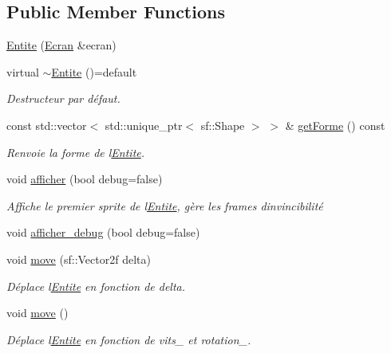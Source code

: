 \subsection*{Public Member Functions}
\begin{DoxyCompactItemize}
\item 
\mbox{\hyperlink{class_entite_a144da7dfc4ebff745b901e75c6167857}{Entite}} (\mbox{\hyperlink{class_ecran}{Ecran}} \&ecran)
\item 
virtual \mbox{\hyperlink{class_entite_a8084762a25afbfbcdca31121a3dfcd87}{$\sim$\+Entite}} ()=default
\begin{DoxyCompactList}\small\item\em Destructeur par défaut. \end{DoxyCompactList}\item 
const std\+::vector$<$ std\+::unique\+\_\+ptr$<$ sf\+::\+Shape $>$ $>$ \& \mbox{\hyperlink{class_entite_ad7314f276ea1808e98cfd8b7d0e900c8}{get\+Forme}} () const
\begin{DoxyCompactList}\small\item\em Renvoie la forme de l\textquotesingle{}\mbox{\hyperlink{class_entite}{Entite}}. \end{DoxyCompactList}\item 
void \mbox{\hyperlink{class_entite_ae8bcb6d81087b421b03f6a97b3aedb8c}{afficher}} (bool debug=false)
\begin{DoxyCompactList}\small\item\em Affiche le premier sprite de l\textquotesingle{}\mbox{\hyperlink{class_entite}{Entite}}, gère les frames d\textquotesingle{}invincibilité \end{DoxyCompactList}\item 
void \mbox{\hyperlink{class_entite_ac241fa1af0c598a820e2cae2ede17ac4}{afficher\+\_\+debug}} (bool debug=false)
\item 
void \mbox{\hyperlink{class_entite_a0e682335d5ae1518970a30eb07d8e6d1}{move}} (sf\+::\+Vector2f delta)
\begin{DoxyCompactList}\small\item\em Déplace l\textquotesingle{}\mbox{\hyperlink{class_entite}{Entite}} en fonction de {\itshape delta}. \end{DoxyCompactList}\item 
void \mbox{\hyperlink{class_entite_a2403ba6bc4c194e7421b6edd3228b69a}{move}} ()
\begin{DoxyCompactList}\small\item\em Déplace l\textquotesingle{}\mbox{\hyperlink{class_entite}{Entite}} en fonction de vits\+\_\+ et rotation\+\_\+. \end{DoxyCompactList}\item 

\end{DoxyCompactItemize}
